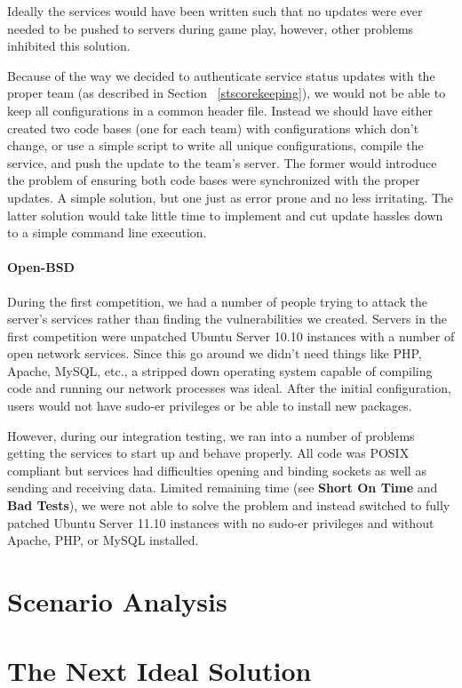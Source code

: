 \documentclass[10pt]{article}
\begin{document}
Ideally the services would have been written such that no updates were ever
needed to be pushed to servers during game play, however, other problems
inhibited this solution. 

Because of the way we decided to authenticate service status updates with
the proper team (as described in Section ~\ref{stscorekeeping}), we would
not be able to keep all configurations in a common header file. Instead we
should have either created two code bases (one for each team) with
configurations which don't change, or use a simple script to write all unique
configurations, compile the service, and push the update to the team's server.
The former would introduce the problem of ensuring both code bases were
synchronized with the proper updates. A simple solution, but one just as error
prone and no less irritating. The latter solution would take little time to
implement and cut update hassles down to a simple command line execution.

\paragraph*{Open-BSD} During the first competition, we had a
number of people trying to attack the server's services rather than finding the vulnerabilities
we created. Servers in the first competition were unpatched Ubuntu Server 10.10
instances with a number of open network services. Since this go around we didn't
need things like PHP, Apache, MySQL, etc., a stripped down operating system
capable of compiling code and running our network processes was ideal. After the
initial configuration, users would not have sudo-er privileges or be able to
install new packages. 

However, during our integration testing, we ran into a number of problems
getting the services to start up and behave properly. All code was POSIX
compliant but services had difficulties opening and binding sockets as well as
sending and receiving data. Limited remaining time (see \textbf{Short On Time}
and \textbf{Bad Tests}), we were not able to solve the problem and instead
switched to fully patched Ubuntu Server 11.10 instances with no sudo-er
privileges and without Apache, PHP, or MySQL installed. 

\section{Scenario Analysis}


\section{The Next Ideal Solution}
\end{document}
